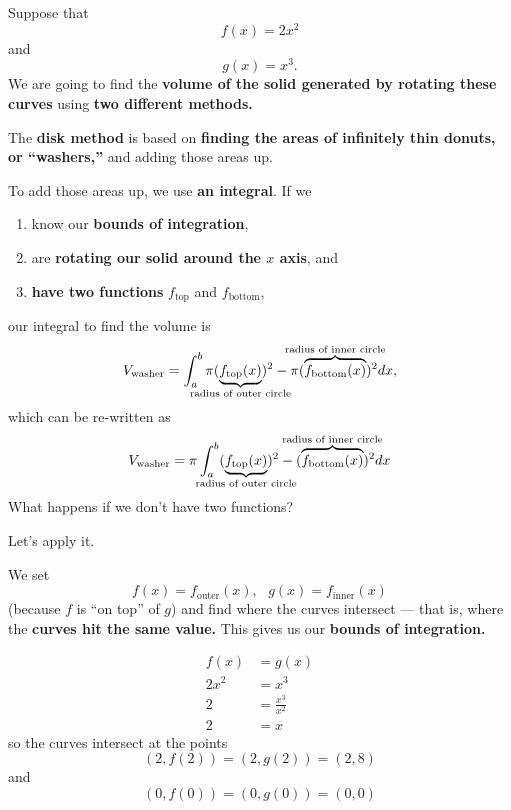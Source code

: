 \documentclass[11pt,serif,aspectratio=169]{beamer}
\begin{document}
	\begin{frame}
		Suppose that $$f(x) = 2x^2$$ and $$g(x) = x^3.$$
		We are going to find the \textbf{volume of the solid generated by rotating these curves} using \textbf{two different methods.}
	\end{frame}
	
	\begin{frame}
	\end{frame}
	
	\begin{frame}
		The \textbf{disk method} is based on \textbf{finding the areas of infinitely thin donuts, or ``washers,''} and adding those areas up.
	\end{frame}
	
	\begin{frame}
		To add those areas up, we use \textbf{an integral}. If we
		\begin{enumerate}[label=(\roman*)]
			\item know our \textbf{bounds of integration},
			\item are \textbf{rotating our solid around the $x$ axis}, and
			\item \textbf{have two functions} $f_{\text{top}}$ and $f_{\text{bottom}}$,
		\end{enumerate}
		our integral to find the volume is $$ V_{\text{washer}} = \int_a^b \pi(\underbrace{f_{\text{top}}(x)}_{\mathclap{\text{radius of outer circle}}})^2 -\pi (\overbrace{f_{\text{bottom}}(x)}^{\mathclap{\text{radius of inner circle}}})^2 dx,$$ which can be re-written as $$ V_{\text{washer}} = \pi \int_a^b (\underbrace{f_{\text{top}}(x)}_{\mathclap{\text{radius of outer circle}}})^2 - (\overbrace{f_{\text{bottom}}(x)}^{\mathclap{\text{radius of inner circle}}})^2 dx$$
		\footnotesize{What happens if we don't have two functions?}
	\end{frame}
	
	\begin{frame}\centering
		Let's apply it.
	\end{frame}
	
	\begin{frame}
		We set $$ f(x) = f_\text{outer}(x), \ \ \ g(x) = f_\text{inner}(x)$$ (because $f$ is ``on top'' of $g$)
		and find where the curves intersect --- that is, where the \textbf{curves hit the same value.} This gives us our \textbf{bounds of integration.}
	\end{frame}
	
	\begin{frame}
		\begin{align*}
			f(x) &= g(x) \\[1em]
			2x^2 &= x^3 \\
			2 &= \frac{x^3}{x^2} \\
			2 &= x
		\end{align*}
		so the curves intersect at the points $$ (2, f(2)) = (2, g(2)) = (2, 8) $$ and $$ (0, f(0)) = (0, g(0)) = (0, 0) $$
	\end{frame}
	
\end{document}
